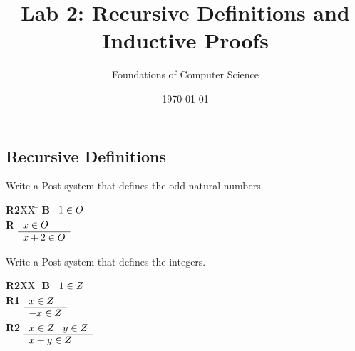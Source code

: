 \documentclass[]{exam}
\title{Lab 2: Recursive Definitions and Inductive Proofs}
\author{Foundations of Computer Science}
\date{\today}
\begin{document}
\maketitle

\begin{questions}

\section*{Recursive Definitions}
\question Write a Post system that defines the odd natural numbers.
\begin{solution}
\begin{tabbing}
{\bf R2}XX \=  \kill
{\bf B} \>
        \(\begin{array}[t]{l}
        1\in O
        \end{array}\) \\[2ex]
{\bf R} \>
        \(\begin{array}[t]{l}
        x \in O \\
        \hline
        x + 2 \in O
        \end{array}\)
\end{tabbing}
\end{solution}

\question Write a Post system that defines the integers.
\begin{solution}
\begin{tabbing}
{\bf R2}XX \=  \kill
{\bf B} \>
        \(\begin{array}[t]{l}
        1\in Z
        \end{array}\) \\[2ex]
{\bf R1} \>
        \(\begin{array}[t]{l}
        x \in Z \\
        \hline
        -x \in Z
        \end{array}\) \\[2ex]
{\bf R2} \>
        \(\begin{array}[t]{l}
        x \in Z \;\;\;y \in Z \\
        \hline
        x + y \in Z
        \end{array}\)
\end{tabbing}
\end{solution}



\end{questions}
\end{document}
